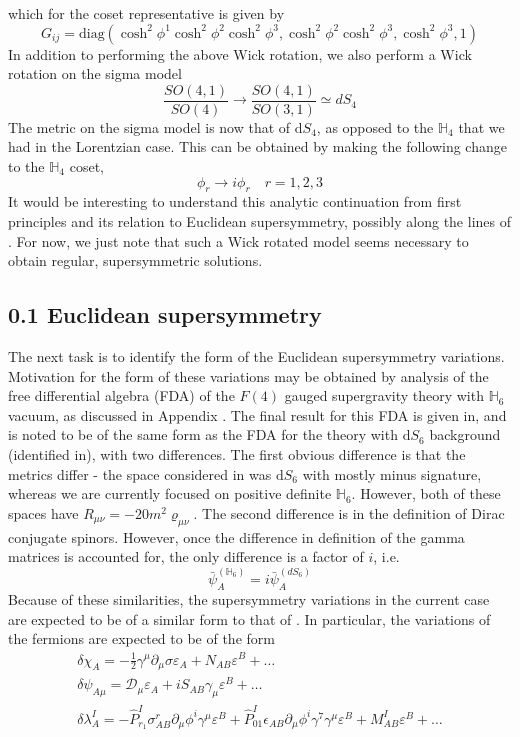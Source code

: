\documentclass{article}
\begin{document}
which for the coset representative is given by
\[
G_{i j}=\mathrm{diag}\left(\cosh ^{2} \phi ^{1} \cosh ^{2} \phi ^{2} \cosh ^{2} \phi ^{3}, \cosh ^{2} \phi ^{2} \cosh ^{2}\phi ^{3}, \cosh ^{2} \phi ^{3}, 1\right)
\]
In addition to performing the above Wick rotation, we also perform a Wick rotation on the sigma model
\[
\frac{S O(4,1)}{S O(4)} \rightarrow \frac{S O(4,1)}{S O(3,1)} \simeq d S_{4}
\]
The metric on the sigma model is now that of \(\mathrm{d} S_{4}\), as opposed to the \(\mathbb{H}_{4}\) that we had in the Lorentzian case. This can be obtained by making the following change to the \(\mathbb{H}_{4}\) coset,
\[
\phi_{r} \rightarrow i \phi_{r} \quad r=1,2,3
\]
It would be interesting to understand this analytic continuation from first principles and its relation to Euclidean supersymmetry, possibly along the lines of . For now, we just note that such a Wick rotated model seems necessary to obtain regular, supersymmetric solutions.
\subsection*{0.1 Euclidean supersymmetry}
The next task is to identify the form of the Euclidean supersymmetry variations. Motivation for the form of these variations may be obtained by analysis of the free differential algebra (FDA) of the \(F(4)\) gauged supergravity theory with \(\mathbb{H}_{6}\) vacuum, as discussed in Appendix . The final result for this FDA is given in, and is noted to be of the same form as the FDA for the theory with \(\mathrm{d} S_{6}\) background (identified in), with two differences. The first obvious difference is that the metrics differ - the space considered in was \(\mathrm{d} S_{6}\) with mostly minus signature, whereas we are currently focused on positive definite \(\mathbb{H}_{6}\). However, both of these spaces have \(R_{\mu \nu}=-20 m^{2} \varrho_{\mu \nu}\). The second difference is in the definition of Dirac conjugate spinors. However, once the difference in definition of the gamma matrices is accounted for, the only difference is a factor of \(i\), i.e.
\[
\bar{\psi}_{A}^{(\mathbb{H}_{6})}=i \bar{\psi}_{A}^{(d S_{6})}
\]
Because of these similarities, the supersymmetry variations in the current case are expected to be of a similar form to that of . In particular, the variations of the fermions are expected to be of the form
\[
\begin{array}{c}
\delta \chi_{A}=-\frac{1}{2} \gamma^{\mu} \partial_{\mu} \sigma \varepsilon_{A}+N_{A B} \varepsilon^{B}+\ldots \\
\delta \psi_{A \mu}=\mathcal{D}_{\mu} \varepsilon_{A}+i S_{A B} \gamma_{\mu} \varepsilon^{B}+\ldots \\
\delta \lambda_{A}^{I}=-\hat{P}_{r_{1}}^{I} \sigma_{A B}^{r} \partial_{\mu} \phi^{i} \gamma^{\mu} \varepsilon^{B}+\hat{P}_{01}^{I} \epsilon_{A B} \partial_{\mu} \phi^{i} \gamma^{7} \gamma^{\mu} \varepsilon^{B}+M_{A B}^{I} \varepsilon^{B}+\ldots
\end{array}
\]
\end{document}
